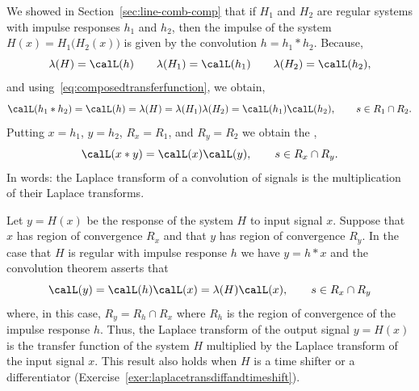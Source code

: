 
We showed in Section~\ref{sec:line-comb-comp} that if $H_1$ and $H_2$ are regular systems with impulse responses $h_1$ and $h_2$, then the impulse of the system $H(x) = H_1\big(H_2(x)\big)$ is given by the convolution $h = h_1 * h_2$.  Because,
\[
\lambda(H) = \calL(h) \qquad \lambda(H_1) = \calL(h_1) \qquad \lambda(H_2) = \calL(h_2),
\] 
and using~\eqref{eq:composedtransferfunction}, we obtain,
\[
\calL(h_1 * h_2) = \calL(h) =  \lambda(H) = \lambda(H_1)\lambda(H_2) = \calL(h_1) \calL(h_2), \qquad s \in R_1 \cap R_2.
\]
Putting $x = h_1$, $y = h_2$, $R_x = R_1$, and $R_y = R_2$ we obtain the ,
\begin{equation}\label{eq:convtheoremlaplace}
\calL(x*y) = \calL(x) \calL(y), \qquad s \in R_x \cap R_y.
\end{equation}
In words: the Laplace transform of a convolution of signals is the multiplication of their Laplace transforms.


Let $y = H(x)$ be the response of the system $H$ to input signal $x$.  Suppose that $x$ has region of convergence $R_x$ and that $y$ has region of convergence $R_y$.  In the case that $H$ is regular with impulse response $h$ we have $y = h * x$ and the convolution theorem asserts that
\begin{equation}\label{eq:transferLaplcetheorem}
\calL(y) = \calL(h)\calL(x) = \lambda(H)\calL(x), \qquad s \in R_x \cap R_y
\end{equation}
where, in this case, $R_y = R_h \cap R_x$ where $R_h$ is the region of convergence of the impulse response $h$.  Thus, the Laplace transform of the output signal $y = H(x)$ is the transfer function of the system $H$ multiplied by the Laplace transform of the input signal $x$.  This result also holds when $H$ is a time shifter or a differentiator (Exercise~\ref{exer:laplacetransdiffandtimeshift}).


